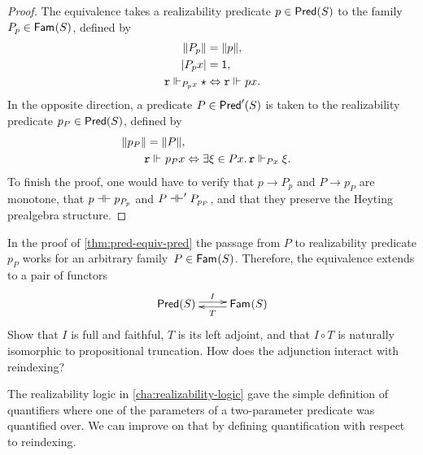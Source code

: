 \begin{proof}
  The equivalence takes a realizability predicate $p \in \Pred{S}$ to the family
  $P_p \in \Fam{S}$, defined by
  \begin{align*}
    \T{P_p} &= \T{p}, \\
    \S{P_p x} &= \one, \\
    \R{r} \rz[P_p x] \star &\liff \R{r} \rz p x.
  \end{align*}
  In the opposite direction, a predicate $P \in \PredT{S}$ is taken to the realizability predicate $p_P \in \Pred{S}$, defined by
  \begin{align*}
    \T{p_P} = \T{P}, \\
    \R{r} \rz p_P x &\liff \some{\xi \in P x} \R{r} \rz[P x] \xi.
  \end{align*}
  To finish the proof, one would have to verify that $p \to P_p$ and $P \to p_P$ are monotone, that $p \bientails p_{P_p}$ and $P \bientails' P_{p_P}$, and that they preserve the Heyting prealgebra structure.
\end{proof}

\begin{exercise}
  In the proof of \cref{thm:pred-equiv-pred} the passage from $P$ to realizability predicate $p_P$ works for an arbitrary family~$P \in \Fam{S}$. Therefore, the equivalence extends to a pair of functors
  \begin{equation*}
    \xymatrix{
      {\Pred{S}}
      \ar@<0.5ex>[r]^{I}
      &
      {\Fam{S}}
      \ar@<0.5ex>[l]^{T}
    }
  \end{equation*}
  Show that $I$ is full and faithful, $T$ is its left adjoint, and that $I \circ T$ is naturally isomorphic to propositional truncation. How does the adjunction interact with reindexing?
\end{exercise}

The realizability logic in \cref{cha:realizability-logic} gave the simple definition of quantifiers where one of the parameters of a two-parameter predicate was quantified over. We can improve on that by defining quantification with respect to reindexing.

